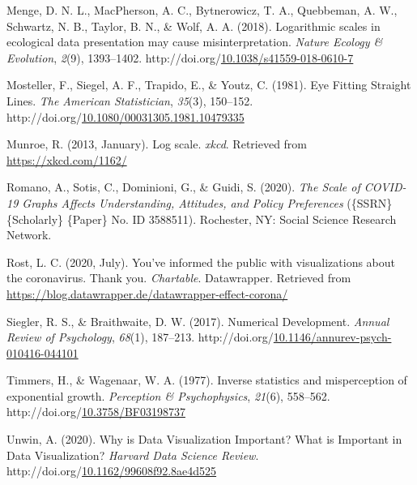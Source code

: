 \documentclass[print]{nuthesis}
\newlength{\cslhangindent}
\newenvironment{CSLReferences}%
{\setlength{\parindent}{0pt}%
\everypar{\setlength{\hangindent}{\cslhangindent}}\ignorespaces}%
{\par}
\begin{document}
\begin{CSLReferences}{1}{0}
\leavevmode\hypertarget{ref-menge_logarithmic_2018}{}%
Menge, D. N. L., MacPherson, A. C., Bytnerowicz, T. A., Quebbeman, A. W., Schwartz, N. B., Taylor, B. N., \& Wolf, A. A. (2018). Logarithmic scales in ecological data presentation may cause misinterpretation. \emph{Nature Ecology \& Evolution}, \emph{2}(9), 1393--1402. http://doi.org/\href{https://doi.org/10.1038/s41559-018-0610-7}{10.1038/s41559-018-0610-7}

\leavevmode\hypertarget{ref-mosteller_eye_1981}{}%
Mosteller, F., Siegel, A. F., Trapido, E., \& Youtz, C. (1981). Eye {Fitting} {Straight} {Lines}. \emph{The American Statistician}, \emph{35}(3), 150--152. http://doi.org/\href{https://doi.org/10.1080/00031305.1981.10479335}{10.1080/00031305.1981.10479335}

\leavevmode\hypertarget{ref-xkcd}{}%
Munroe, R. (2013, January). Log scale. \emph{xkcd}. Retrieved from \url{https://xkcd.com/1162/}

\leavevmode\hypertarget{ref-romano_scale_2020}{}%
Romano, A., Sotis, C., Dominioni, G., \& Guidi, S. (2020). \emph{The {Scale} of {COVID}-19 {Graphs} {Affects} {Understanding}, {Attitudes}, and {Policy} {Preferences}} (\{SSRN\} \{Scholarly\} \{Paper\} No. ID 3588511). Rochester, NY: Social Science Research Network.

\leavevmode\hypertarget{ref-rost_2020}{}%
Rost, L. C. (2020, July). You've informed the public with visualizations about the coronavirus. Thank you. \emph{Chartable}. Datawrapper. Retrieved from \url{https://blog.datawrapper.de/datawrapper-effect-corona/}

\leavevmode\hypertarget{ref-siegler_numerical_2017}{}%
Siegler, R. S., \& Braithwaite, D. W. (2017). Numerical {Development}. \emph{Annual Review of Psychology}, \emph{68}(1), 187--213. http://doi.org/\href{https://doi.org/10.1146/annurev-psych-010416-044101}{10.1146/annurev-psych-010416-044101}

\leavevmode\hypertarget{ref-timmers_inverse_1977}{}%
Timmers, H., \& Wagenaar, W. A. (1977). Inverse statistics and misperception of exponential growth. \emph{Perception \& Psychophysics}, \emph{21}(6), 558--562. http://doi.org/\href{https://doi.org/10.3758/BF03198737}{10.3758/BF03198737}

\leavevmode\hypertarget{ref-unwin_why_2020}{}%
Unwin, A. (2020). Why is {Data} {Visualization} {Important}? {What} is {Important} in {Data} {Visualization}? \emph{Harvard Data Science Review}. http://doi.org/\href{https://doi.org/10.1162/99608f92.8ae4d525}{10.1162/99608f92.8ae4d525}


\end{CSLReferences}
\end{document}
